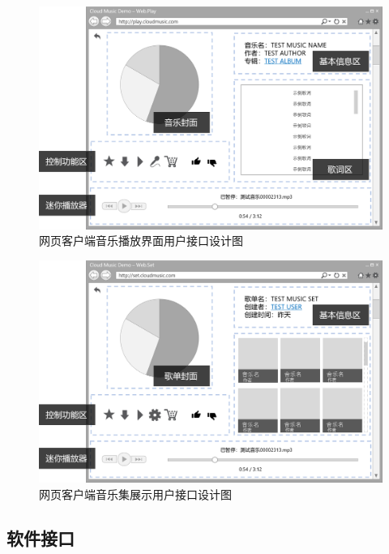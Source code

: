 \begin{figure}[h!]
  \centering
 
  \includegraphics[width=.95\linewidth]{figures/web_music}

  \caption{ \label{fig:web_music}
  		网页客户端音乐播放界面用户接口设计图
    }
\end{figure}

\begin{figure}[h!]
  \centering

  \includegraphics[width=.95\linewidth]{figures/web_collection}

  \caption{  \label{fig:web_collection}
  		网页客户端音乐集展示用户接口设计图
    }
\end{figure}



\subsection{软件接口}

